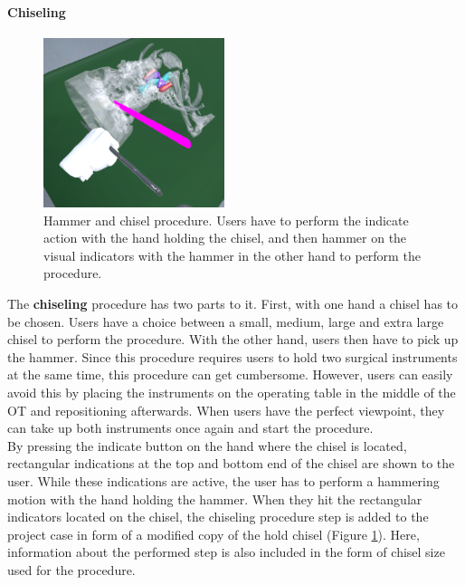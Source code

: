 \paragraph{Chiseling}

\begin{figure}[ht]
    \centering
    \includegraphics[width=200px]{images/implementation/features/procedures/chisel.png}
    \caption{\label{fig::FeatureChisel}Hammer and chisel procedure. Users have to perform the indicate action with the hand holding the chisel, and then hammer on the visual 
    indicators with the hammer in the other hand to perform the procedure.}
\end{figure}

The \textbf{chiseling} procedure has two parts to it.
First, with one hand a chisel has to be chosen.
Users have a choice between a small, medium, large and extra large chisel to perform the procedure.
With the other hand, users then have to pick up the hammer.
Since this procedure requires users to hold two surgical instruments at the same time, this procedure can get cumbersome.
However, users can easily avoid this by placing the instruments on the operating table in the middle of the OT and repositioning afterwards.
When users have the perfect viewpoint, they can take up both instruments once again and start the procedure.
\\ By pressing the indicate button on the hand where the chisel is located, rectangular indications at the top and bottom end of the chisel are shown to the user.
While these indications are active, the user has to perform a hammering motion with the hand holding the hammer.
When they hit the rectangular indicators located on the chisel, the chiseling procedure step is added to the project case in form of a modified copy of the hold chisel (Figure \ref{fig::FeatureChisel}).
Here, information about the performed step is also included in the form of chisel size used for the procedure. 